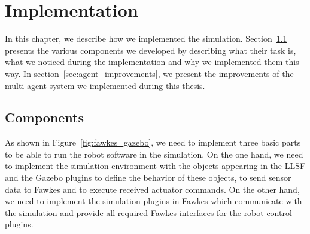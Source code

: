 \chapter{Implementation}
\label{cha:implementation}
In this chapter, we describe how we implemented the simulation. Section~\ref{sec:components} presents the various components we developed by describing what their task is, what we noticed during the implementation and why we implemented them this way. In section~\ref{sec:agent_improvements}, we present the improvements of the multi-agent system we implemented during this thesis.

\section{Components}
\label{sec:components}
As shown in Figure~\ref{fig:fawkes_gazebo}, we need to implement three basic parts to be able to run the robot software in the simulation. On the one hand, we need to implement the simulation environment with the objects appearing in the LLSF and the Gazebo plugins to define the behavior of these objects, to send sensor data to Fawkes and to execute received actuator commands. On the other hand, we need to implement the simulation plugins in Fawkes which communicate with the simulation and provide all required Fawkes-interfaces for the robot control plugins.

